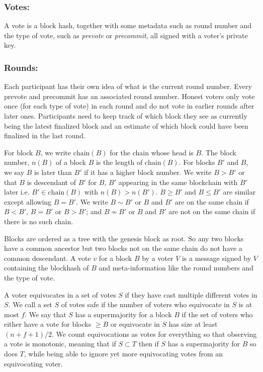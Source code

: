 \documentclass[a4paper,UKenglish,cleveref, autoref, thm-restate, anonymous]{lipics-v2019}
\begin{document}
\subsubsection{Votes:}A vote is a block hash, together with some metadata such as round number and the type of vote, such as {\em prevote} or {\em precommit}, all signed with a voter's private key.

\subsubsection{Rounds:}Each participant has their own idea of what is the current round number. Every prevote and precommit has an associated round number. Honest voters only vote once (for each type of vote) in each round and do not vote in earlier rounds after later ones.
Participants need to keep track of which block they see as currently being the latest finalized block and an estimate of which block could have been finalized in the last round. 


For block $B$, we write $\mathrm{chain}(B)$ for the chain whose head is $B$. The block number, $n(B)$ of a block $B$ is the length of $\mathrm{chain}(B)$.
For blocks $B'$ and $B$, we say $B$ is later than $B'$ if it has a higher block number.
We write $B > B'$ or that $B$ is descendant of $B'$ for $B$, $B'$ appearing in the same blockchain with $B'$ later i.e. $B' \in \mathrm{chain}(B)$ with $n(B) > n(B')$.
$B \geq B'$ and $B \leq B'$ are similar except allowing $B = B'$.
We write $B \sim B'$ or $B$ and $B'$ are on the same chain if $B<B'$, $B=B'$ or $B> B'$; and $B \nsim B'$ or $B$ and $B'$ are not on the same chain if there is no such chain.

Blocks are ordered as a tree with the genesis block as root. So any two blocks have a common ancestor but two blocks not on the same chain do not have a common descendant.
A vote $v$ for a block $B$ by a voter $V$ is a message signed by $V$ containing the blockhash of $B$ and meta-information like the round numbers and the type of vote. 

A voter equivocates in a set of votes $S$ if they have cast multiple different votes in $S$. We call a set $S$ of votes safe if the number of voters who equivocate in $S$ is at most $f$. We say that $S$ has a supermajority for a block $B$ if the set of voters who either have a vote for blocks $\geq B$ or equivocate in $S$ has size at least $(n+f+1)/2$.  We count equivocations as votes for everything so that observing a vote is monotonic, meaning that if $S \subset T$ then if $S$ has a supermajority for $B$ so does $T$, while being able to ignore yet more equivocating votes from an equivocating voter.
\end{document}
